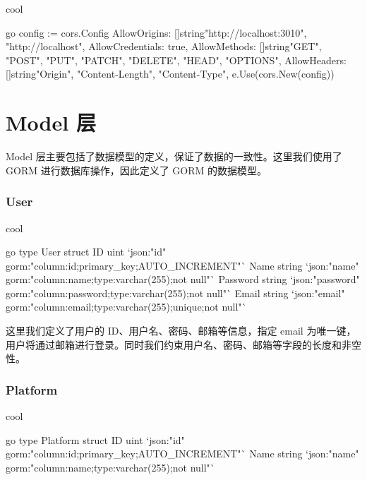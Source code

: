 \begin{codebox}{}{cool}
\begin{amzcode}{go}
config := cors.Config{
    AllowOrigins:     []string{"http://localhost:3010", "http://localhost"},
    AllowCredentials: true,
    AllowMethods:     []string{"GET", "POST", "PUT", "PATCH", "DELETE", "HEAD", "OPTIONS"},
    AllowHeaders:     []string{"Origin", "Content-Length", "Content-Type"},
}
e.Use(cors.New(config))
\end{amzcode}
\end{codebox}

\section{Model 层}

Model 层主要包括了数据模型的定义，保证了数据的一致性。这里我们使用了 GORM 进行数据库操作，因此定义了 GORM 的数据模型。

\subsubsection{User}

\begin{codebox}{}{cool}
\begin{amzcode}{go}
type User struct {
	ID       uint   `json:"id" gorm:"column:id;primary_key;AUTO_INCREMENT"`
	Name     string `json:"name" gorm:"column:name;type:varchar(255);not null"`
	Password string `json:"password" gorm:"column:password;type:varchar(255);not null"`
	Email    string `json:"email" gorm:"column:email;type:varchar(255);unique;not null"`
}
\end{amzcode}
\end{codebox}

这里我们定义了用户的 ID、用户名、密码、邮箱等信息，指定 email 为唯一键，用户将通过邮箱进行登录。同时我们约束用户名、密码、邮箱等字段的长度和非空性。

\subsubsection{Platform}

\begin{codebox}{}{cool}
\begin{amzcode}{go}
type Platform struct {
	ID   uint   `json:"id" gorm:"column:id;primary_key;AUTO_INCREMENT"`
	Name string `json:"name" gorm:"column:name;type:varchar(255);not null"`
}
\end{amzcode}
\end{codebox}

